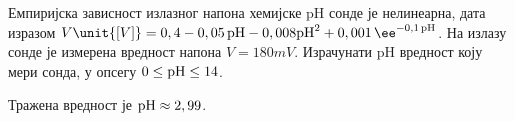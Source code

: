 \PID
Емпиријска зависност излазног напона хемијске pH сонде је нелинеарна, дата изразом 
${V\unit{[V]} = 0,4 - 0,05\,{\rm pH} - 0,008{\rm pH}^2 + 0,001 \, \ee^{-0,1\,{\rm pH}}}$.  
На излазу сонде је измерена вредност напона $V = 180\unit{mV}$. Израчунати pH 
вредност коју мери сонда, у опсегу 
$0 \leq {\rm pH} \leq 14$.

\REZULTAT 
Тражена вредност је ${\rm pH} \approx 2,99$. 